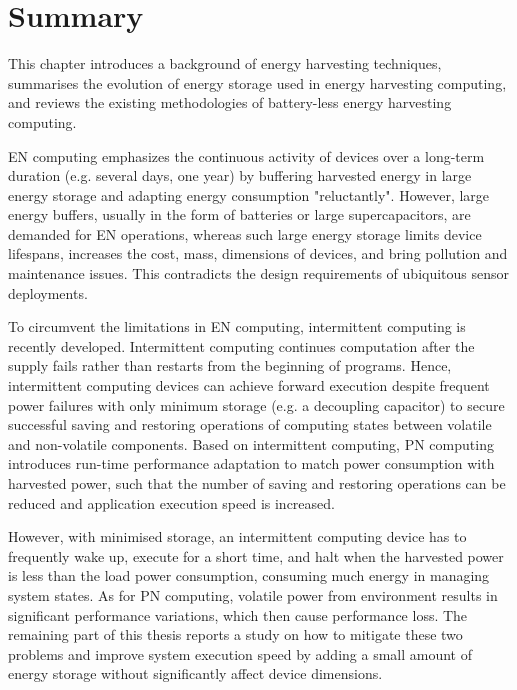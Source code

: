\section{Summary} \label{sec:ch2_summary}

This chapter introduces a background of energy harvesting techniques, summarises the evolution of energy storage used in energy harvesting computing, and reviews the existing methodologies of battery-less energy harvesting computing. 

EN computing emphasizes the continuous activity of devices over a long-term duration (e.g. several days, one year) by buffering harvested energy in large energy storage and adapting energy consumption "reluctantly". However, large energy buffers, usually in the form of batteries or large supercapacitors, are demanded for EN operations, whereas such large energy storage limits device lifespans, increases the cost, mass, dimensions of devices, and bring pollution and maintenance issues. This contradicts the design requirements of ubiquitous sensor deployments. 

To circumvent the limitations in EN computing, intermittent computing is recently developed. Intermittent computing continues computation after the supply fails rather than restarts from the beginning of programs. Hence, intermittent computing devices can achieve forward execution despite frequent power failures with only minimum storage (e.g. a decoupling capacitor) to secure successful saving and restoring operations of computing states between volatile and non-volatile components. Based on intermittent computing, PN computing introduces run-time performance adaptation to match power consumption with harvested power, such that the number of saving and restoring operations can be reduced and application execution speed is increased. 

However, with minimised storage, an intermittent computing device has to frequently wake up, execute for a short time, and halt when the harvested power is less than the load power consumption, consuming much energy in managing system states. As for PN computing, volatile power from environment results in significant performance variations, which then cause performance loss. The remaining part of this thesis reports a study on how to mitigate these two problems and improve system execution speed by adding a small amount of energy storage without significantly affect device dimensions. 
